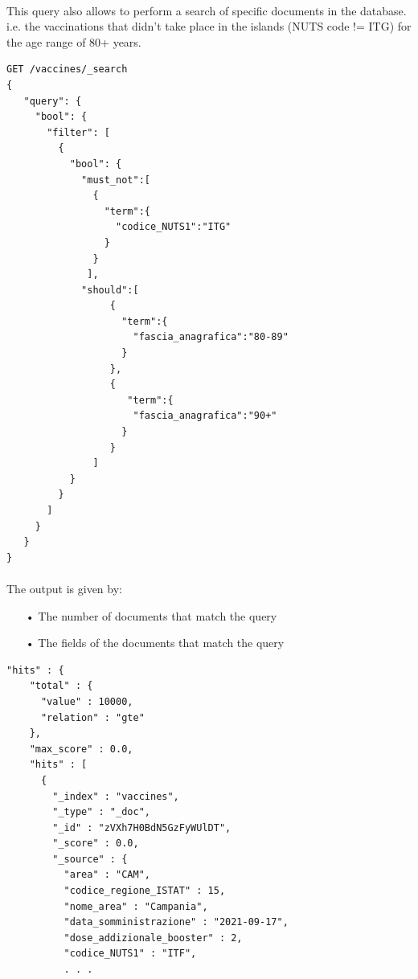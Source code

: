 \documentclass[a4paper,12pt]{article}
\begin{document}
\paragraph{} This query also allows to perform a search of specific documents in the database. i.e. the vaccinations that didn't take place in the islands (NUTS code != ITG) for the age range of 80+ years. 
\begin{tcolorbox}[colback=green!5!white,colframe=green!75!black,title=QUERY]
\begin{verbatim}
GET /vaccines/_search
{  
   "query": {
     "bool": {
       "filter": [
         {
           "bool": {
             "must_not":[
               {
                 "term":{
                   "codice_NUTS1":"ITG"
                 }
               }
              ],
             "should":[  
                  {
                    "term":{
                      "fascia_anagrafica":"80-89"
                    }
                  },
                  {  
                     "term":{
                      "fascia_anagrafica":"90+"
                    }
                  }
               ]
           }
         }
       ]
     }
   }
}
\end{verbatim}
\end{tcolorbox}
\newpage

\paragraph{} The output is given by: 
\begin{itemize}[noitemsep]
\item[•] The number of documents that match the query
\item[•] The fields of the documents that match the query
\end{itemize}

\begin{tcolorbox}[colback=red!5!white,colframe=red!75!black,title=OUTPUT]
\begin{verbatim}
"hits" : {
    "total" : {
      "value" : 10000,
      "relation" : "gte"
    },
    "max_score" : 0.0,
    "hits" : [
      {
        "_index" : "vaccines",
        "_type" : "_doc",
        "_id" : "zVXh7H0BdN5GzFyWUlDT",
        "_score" : 0.0,
        "_source" : {
          "area" : "CAM",
          "codice_regione_ISTAT" : 15,
          "nome_area" : "Campania",
          "data_somministrazione" : "2021-09-17",
          "dose_addizionale_booster" : 2,
          "codice_NUTS1" : "ITF",
          . . .
\end{verbatim}
\end{tcolorbox}
\newpage
\end{document}
